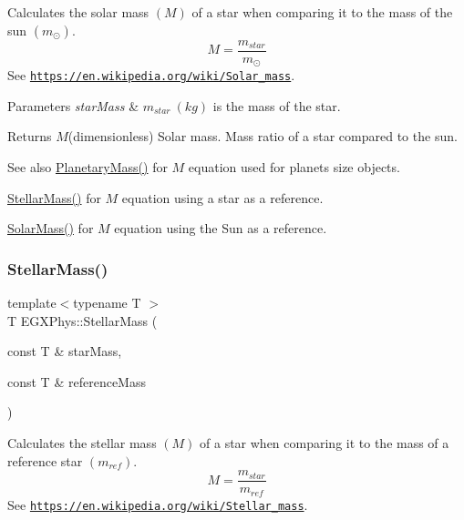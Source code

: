 Calculates the solar mass $(M)$ of a star when comparing it to the mass of the sun $(m_\odot)$. \[M=\frac{m_{star}}{m_\odot}\] See \href{https://en.wikipedia.org/wiki/Solar_mass}{\tt https\+://en.\+wikipedia.\+org/wiki/\+Solar\+\_\+mass}. 


\begin{DoxyParams}{Parameters}
{\em star\+Mass} & $m_{star}\ (kg)$ is the mass of the star. \\
\hline
\end{DoxyParams}
\begin{DoxyReturn}{Returns}
$M$(dimensionless) Solar mass. Mass ratio of a star compared to the sun. 
\end{DoxyReturn}
\begin{DoxySeeAlso}{See also}
\mbox{\hyperlink{group___e_g_x_phys-_planetary_mass_ga225bcf56fb37468f6d4d46493d403503}{Planetary\+Mass()}} for $M$ equation used for planets size objects. 

\mbox{\hyperlink{group___e_g_x_phys-_stellar_mass_gabbd6081cd3bfb0153d7470d58f733a61}{Stellar\+Mass()}} for $M$ equation using a star as a reference. 

\mbox{\hyperlink{group___e_g_x_phys-_stellar_mass_gac393d64d586be3dc76ac7a98ac336514}{Solar\+Mass()}} for $M$ equation using the Sun as a reference. 
\end{DoxySeeAlso}
\mbox{\label{group___e_g_x_phys-_stellar_mass_gabbd6081cd3bfb0153d7470d58f733a61}} 
\subsubsection{\texorpdfstring{Stellar\+Mass()}{StellarMass()}}
{\footnotesize\ttfamily template$<$typename T $>$ \\
T E\+G\+X\+Phys\+::\+Stellar\+Mass (\begin{DoxyParamCaption}\item[{const T \&}]{star\+Mass,  }\item[{const T \&}]{reference\+Mass }\end{DoxyParamCaption})}



Calculates the stellar mass $(M)$ of a star when comparing it to the mass of a reference star $(m_{ref})$. \[M=\frac{m_{star}}{m_{ref}}\] See \href{https://en.wikipedia.org/wiki/Stellar_mass}{\tt https\+://en.\+wikipedia.\+org/wiki/\+Stellar\+\_\+mass}. 


